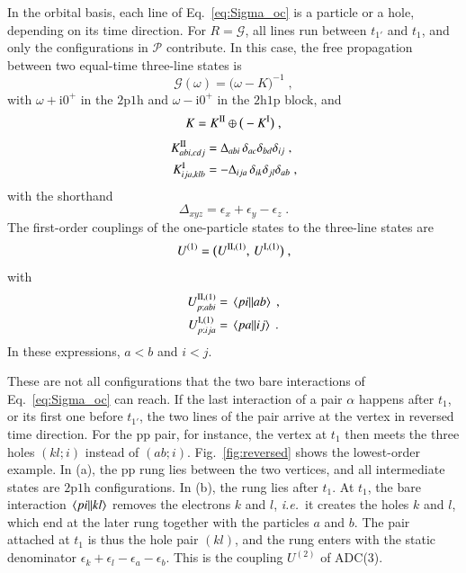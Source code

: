 \documentclass[aip,jcp,reprint,noshowkeys,superscriptaddress]{revtex4-1}
\newcommand{\ie}{\textit{i.e.}}
\newcommand{\eps}{\epsilon}
\newcommand{\ii}{\mathrm{i}}
\newcommand{\hhp}{\text{2h1p}}
\newcommand{\pph}{\text{2p1h}}
\newcommand{\pp}{\text{pp}}
\begin{document}
In the orbital basis, each line of Eq.~\eqref{eq:Sigma_oc} is a particle
or a hole, depending on its time direction. For $R=\mathcal G$, all
lines run between $t_{1'}$ and $t_1$, and only the configurations in
$\mathcal P$ contribute. In this case, 
the free propagation between two equal-time three-line states is
\begin{equation}
\mathcal G(\omega)=\big(\omega-K\big)^{-1} \;,
\label{eq:G_free}
\end{equation}
with $\omega+\ii0^+$ in the $\pph$ and $\omega-\ii0^+$ in the $\hhp$
block, and
\begin{equation}
K=K^{\rm II}\oplus\big(-K^{\rm I}\big) \;,
\nonumber
\end{equation}
\begin{equation}
\begin{aligned}
K^{\rm II}_{abi,cdj}
&=
\Delta_{abi}\,\delta_{ac}\delta_{bd}\delta_{ij} \;,
\\
K^{\rm I}_{ija,klb}
&=
-\Delta_{ija}\,\delta_{ik}\delta_{jl}\delta_{ab} \;,
\end{aligned}
\nonumber
\end{equation}
with the shorthand 
\begin{equation}
\Delta_{xyz}
=
\eps_x+\eps_y-\eps_z \;.
\label{eq:denom_triple}
\end{equation}
The first-order couplings of the one-particle states to the three-line
states are
\begin{equation}
U^{(1)}=\big(U^{{\rm II},(1)},\,U^{{\rm I},(1)}\big) \;,
\label{eq:K_combined}
\end{equation}
with
\begin{equation}
\begin{aligned}
U^{{\rm II},(1)}_{p;abi}
&=
\mel{pi}{}{ab} \;,
\\
U^{{\rm I},(1)}_{p;ija}
&=
\mel{pa}{}{ij} \;.
\end{aligned}
\label{eq:K_U1}
\end{equation}
In these expressions, $a<b$ and $i<j$.


These are not all configurations that the two bare interactions of
Eq.~\eqref{eq:Sigma_oc} can reach. If the last interaction of a pair
$\alpha$ happens after $t_1$, or its first one before $t_{1'}$, the two
lines of the pair arrive at the vertex in reversed time direction. For
the $\pp$ pair, for instance, the vertex at $t_1$ then meets the three
holes $(kl;i)$ instead of $(ab;i)$.
Fig.~\ref{fig:reversed} shows the lowest-order example. In (a), the
$\pp$ rung lies between the two vertices, and all intermediate states are
$\pph$ configurations. In (b), the rung lies after $t_1$. At $t_1$, the
bare interaction $\mel{pi}{}{kl}$ removes the electrons $k$ and $l$,
\ie\ it creates the holes $k$ and $l$, which end at the later rung
together with the particles $a$ and $b$. The pair attached at $t_1$ is
thus the hole pair $(kl)$, and the rung enters with the static
denominator $\eps_k+\eps_l-\eps_a-\eps_b$. This is the coupling
$U^{(2)}$ of ADC(3).
\end{document}
